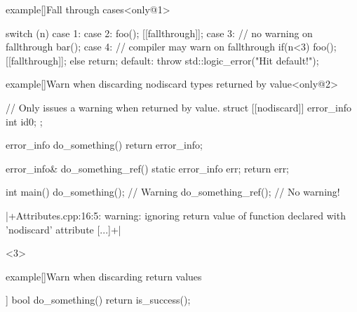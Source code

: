 \begin{frame}[fragile]{}
    \begin{varblock}{example}[\textwidth]{Fall through cases}<only@1>
        \begin{Cpp}
            switch (n) {
                case 1:
                case 2:
                    foo();
                    [[fallthrough]];
                case 3: // no warning on fallthrough
                    bar();
                case 4: // compiler may warn on fallthrough
                    if(n<3)
                    {
                        foo();
                        [[fallthrough]];
                    }
                    else
                        return;
                default:
                    throw std::logic_error("Hit default!");
            }
        \end{Cpp}
    \end{varblock}
    \begin{varblock}{example}[\textwidth]{Warn when discarding nodiscard types returned by value}<only@2>
        \begin{Cpp}
            // Only issues a warning when returned by value.
            struct [[nodiscard]] error_info {
                int id{0};
            };

            error_info do_something() {
                return error_info{};
            }

            error_info& do_something_ref() {
                static error_info err{};
                return err;
            }

            int main(){
                do_something();      // Warning
                do_something_ref();  // No warning!
            }
        \end{Cpp}
        \begin{Bash}[numbers=none]
            |+Attributes.cpp:16:5: warning: ignoring return value of function declared with 'nodiscard' attribute [...]+|
        \end{Bash}
    \end{varblock}
    \begin{onlyenv}<3>
        \begin{varblock}{example}[\textwidth]{Warn when discarding return values}
            \begin{Cpp}
                [[nodiscard]] bool do_something() {
                    return is_success();
                }


\end{Cpp}
\end{varblock}
\end{onlyenv}
\end{frame}
